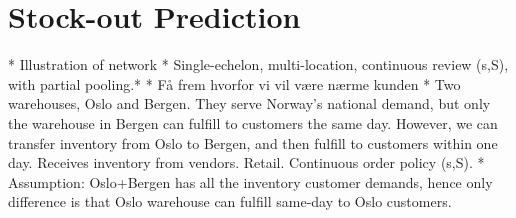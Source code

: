 \documentclass[../../main.tex]{subfiles}
\begin{document}

\section{Stock-out Prediction}

*	Illustration of network
*	Single-echelon, multi-location, continuous review (s,S), with partial pooling.*
*	Få frem hvorfor vi vil være nærme kunden
*	Two warehouses, Oslo and Bergen. They serve Norway’s national demand, but only the warehouse in Bergen can fulfill to customers the same day. However, we can transfer inventory from Oslo to Bergen, and then fulfill to customers within one day. Receives inventory from vendors. Retail. Continuous order policy (s,S). 
*	Assumption: Oslo+Bergen has all the inventory customer demands, hence only difference is that Oslo warehouse can fulfill same-day to Oslo customers.

\end{document}
